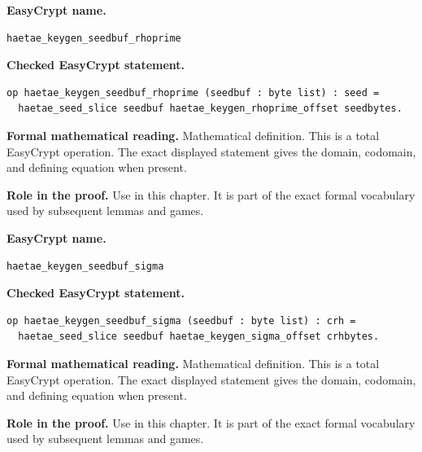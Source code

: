 \begin{formaldefinition}
\noindent\textbf{EasyCrypt name.}
\begin{lstlisting}[language=EasyCrypt,basicstyle=\ttfamily\scriptsize]
haetae_keygen_seedbuf_rhoprime
\end{lstlisting}
\noindent\textbf{Checked EasyCrypt statement.}
\begin{lstlisting}[language=EasyCrypt,basicstyle=\ttfamily\scriptsize]
op haetae_keygen_seedbuf_rhoprime (seedbuf : byte list) : seed =
  haetae_seed_slice seedbuf haetae_keygen_rhoprime_offset seedbytes.
\end{lstlisting}
\noindent\textbf{Formal mathematical reading.}
Mathematical definition. This is a total EasyCrypt operation.  The exact displayed statement gives the domain, codomain, and defining equation when present.

\noindent\textbf{Role in the proof.}
Use in this chapter. It is part of the exact formal vocabulary used by subsequent lemmas and games.

\end{formaldefinition}

\begin{formaldefinition}
\noindent\textbf{EasyCrypt name.}
\begin{lstlisting}[language=EasyCrypt,basicstyle=\ttfamily\scriptsize]
haetae_keygen_seedbuf_sigma
\end{lstlisting}
\noindent\textbf{Checked EasyCrypt statement.}
\begin{lstlisting}[language=EasyCrypt,basicstyle=\ttfamily\scriptsize]
op haetae_keygen_seedbuf_sigma (seedbuf : byte list) : crh =
  haetae_seed_slice seedbuf haetae_keygen_sigma_offset crhbytes.
\end{lstlisting}
\noindent\textbf{Formal mathematical reading.}
Mathematical definition. This is a total EasyCrypt operation.  The exact displayed statement gives the domain, codomain, and defining equation when present.

\noindent\textbf{Role in the proof.}
Use in this chapter. It is part of the exact formal vocabulary used by subsequent lemmas and games.

\end{formaldefinition}

